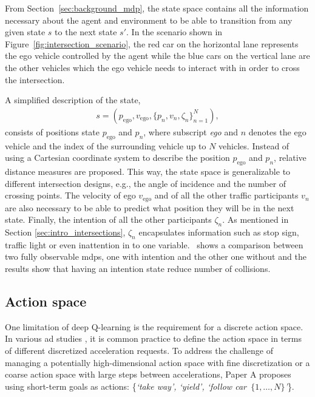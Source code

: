 From Section~\ref{sec:background_mdp}, the state space contains all the information necessary about the agent and environment to be able to transition from any given state $s$ to the next state $s'$. In the scenario shown in Figure~\ref{fig:intersection_scenario}, the red car on the horizontal lane represents the ego vehicle controlled by the agent while the blue cars on the vertical lane are the other vehicles which the ego vehicle needs to interact with in order to cross the intersection. 

A simplified description of the state, 
\begin{align}
	s = (p_\mathrm{ego}, v_\mathrm{ego}, \{p_{n}, v_n, \zeta_n\}_{n=1}^N), 
	\label{eq:state}
\end{align}
consists of positions state $p_\mathrm{ego}$ and $p_n$, where subscript \textit{ego} and $n$ denotes the ego vehicle and the index of the surrounding vehicle up to $N$ vehicles. 
Instead of using a Cartesian coordinate system to describe the position $p_\mathrm{ego}$ and $p_n$, relative distance measures are proposed. This way, the state space is generalizable to different intersection designs, e.g., the angle of incidence and the number of crossing points. 
The velocity of ego $v_\mathrm{ego}$ and of all the other traffic participants $v_n$ are also necessary to be able to predict what position they will be in the next state. Finally, the intention of all the other participants $\zeta_n$. As mentioned in Section \ref{sec:intro_intersections}, $\zeta_n$ encapsulates information such as stop sign, traffic light or even inattention in to one variable. 
\paperBelief \ shows a comparison between two fully observable \gls{mdp}s, one with intention and the other one without and the results show that having an intention state reduce number of collisions. 

\subsection{Action space}
\label{sec:pomdp_actionspace}
One limitation of deep Q-learning is the requirement for a discrete action space. In various \gls{ad} studies \cite{bouton2019}, it is common practice to define the action space in terms of different discretized acceleration requests. 
To address the challenge of managing a potentially high-dimensional action space with fine discretization or a coarse action space with large steps between accelerations, Paper A proposes using short-term goals as actions: \{\textit{`take way', `yield', `follow car~$\{1, \dots , N\}$'}\}.

